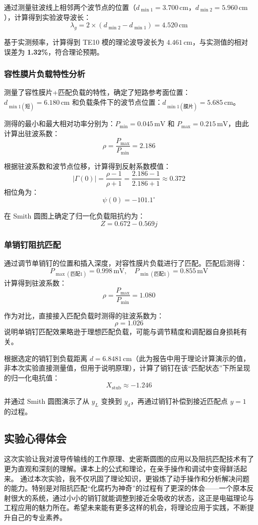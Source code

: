 \documentclass[12pt,a4paper,UTF8]{article}
\begin{document}
通过测量驻波线上相邻两个波节点的位置（$d_{\min1} = 3.700\,\text{cm}$，$d_{\min2} = 5.960\,\text{cm}$），计算得到实验波导波长：
$$
\lambda_g = 2 \times (d_{\min2} - d_{\min1}) = 4.520\,\text{cm}
$$

基于实测频率，计算得到 TE10 模的理论波导波长为 $4.461\,\text{cm}$，与实测值的相对误差为 \textbf{1.32\%}，符合理论预期。

\subsubsection{容性膜片负载特性分析}
测量了容性膜片+匹配负载的特性，确定了短路参考面位置：$d_{\min1(\text{短})} = 6.180\,\text{cm}$ 和负载条件下的波节点位置：$d_{\min1(\text{膜片})} = 5.685\,\text{cm}$。

测得的最小和最大相对功率分别为：$P_{\min} = 0.045\,\text{mV}$ 和 $P_{\max} = 0.215\,\text{mV}$，由此计算出驻波系数：
$$
\rho = \frac{P_{\max}}{P_{\min}} = 2.186
$$

根据驻波系数和波节点位移，计算得到反射系数模值：
$$
|\Gamma(0)| = \frac{\rho - 1}{\rho + 1} = \frac{2.186 - 1}{2.186 + 1} \approx 0.372
$$
相位角为：
$$
\psi(0) = -101.1^\circ
$$

在 Smith 圆图上确定了归一化负载阻抗约为：
$$
Z = 0.672 - 0.569j
$$

\subsubsection{单销钉阻抗匹配}
通过调节单销钉的位置和插入深度，对容性膜片负载进行了匹配。匹配后测得：
$$
P_{\max(\text{匹配1})} = 0.998\,\text{mV}, \quad P_{\min(\text{匹配1})} = 0.855\,\text{mV}
$$
计算得到驻波系数：
$$
\rho = \frac{P_{\max}}{P_{\min}} = 1.080
$$

作为对比，直接接入匹配负载时测得的驻波系数为：
$$
\rho = 1.026
$$
说明单销钉匹配效果略逊于理想匹配负载，可能与调节精度和调配器自身损耗有关。

根据选定的销钉到负载距离 $d = 6.8481\,\text{cm}$（此为报告中用于理论计算演示的值，非本次实验直接测量值，但用于说明原理），计算了销钉在该“匹配状态”下所呈现的归一化电抗值：
$$
X_{\text{stub}} \approx -1.246
$$

并通过 Smith 圆图演示了从 $y_L$ 变换到 $y_d$，再通过销钉补偿到接近匹配点 $y = 1$ 的过程。
\subsection{实验心得体会}
这次实验让我对波导传输线的工作原理、史密斯圆图的应用以及阻抗匹配技术有了更为直观和深刻的理解。课本上的公式和理论，在亲手操作和调试中变得鲜活起来。
通过本次实验，我不仅巩固了理论知识，更锻炼了动手操作和分析解决问题的能力。特别是对阻抗匹配“化腐朽为神奇”的过程有了更深的体会——一个原本反射很大的系统，通过小小的销钉就能调整到接近全吸收的状态，这正是电磁理论与工程应用的魅力所在。希望未来能有更多这样的机会，将理论应用于实践，不断提升自己的专业素养。
\end{document}

